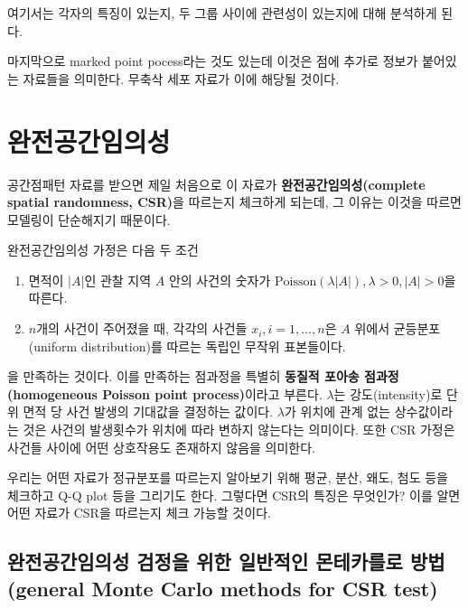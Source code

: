 \documentclass[b5paper,]{scrbook}
\theoremstyle{plain}
\theoremstyle{definition}
\numberwithin{equation}{section}
\let\BeginKnitrBlock\begin \let\EndKnitrBlock\end
\begin{document}
여기서는 각자의 특징이 있는지, 두 그룹 사이에 관련성이 있는지에 대해 분석하게 된다.

마지막으로 marked point pocess라는 것도 있는데 이것은 점에 추가로 정보가 붙어있는 자료들을 의미한다. 무축삭 세포 자료가 이에 해당될 것이다.

\hypertarget{csr}{%
\chapter{완전공간임의성}\label{csr}}

공간점패턴 자료를 받으면 제일 처음으로 이 자료가 \textbf{완전공간임의성(complete spatial randomness, CSR)}을 따르는지 체크하게 되는데, 그 이유는 이것을 따르면 모델링이 단순해지기 때문이다.

\BeginKnitrBlock{definition}[동질적 포아송 점과정]
\protect\hypertarget{def:unnamed-chunk-385}{}{\label{def:unnamed-chunk-385} {} }완전공간임의성 가정은 다음 두 조건

\begin{enumerate}
\def\labelenumi{\arabic{enumi}.}
\item
  면적이 \(|A|\)인 관찰 지역 \(A\) 안의 사건의 숫자가 \(\text{Poisson}(\lambda |A|), \lambda >0, |A| >0\)을 따른다.
\item
  \(n\)개의 사건이 주어졌을 때, 각각의 사건들 \(x_{i}, i=1,\ldots , n\)은 \(A\) 위에서 균등분포(uniform distribution)를 따르는 독립인 무작위 표본들이다.
\end{enumerate}

을 만족하는 것이다. 이를 만족하는 점과정을 특별히 \textbf{동질적 포아송 점과정(homogeneous Poisson point process)}이라고 부른다. \(\lambda\)는 강도(intensity)로 단위 면적 당 사건 발생의 기대값을 결정하는 값이다. \(\lambda\)가 위치에 관계 없는 상수값이라는 것은 사건의 발생횟수가 위치에 따라 변하지 않는다는 의미이다. 또한 CSR 가정은 사건들 사이에 어떤 상호작용도 존재하지 않음을 의미한다.
\EndKnitrBlock{definition}

우리는 어떤 자료가 정규분포를 따르는지 알아보기 위해 평균, 분산, 왜도, 첨도 등을 체크하고 Q-Q plot 등을 그리기도 한다. 그렇다면 CSR의 특징은 무엇인가? 이를 알면 어떤 자료가 CSR을 따르는지 체크 가능할 것이다.

\hypertarget{------general-monte-carlo-methods-for-csr-test}{%
\section{완전공간임의성 검정을 위한 일반적인 몬테카를로 방법 (general Monte Carlo methods for CSR test)}\label{------general-monte-carlo-methods-for-csr-test}}
\end{document}

